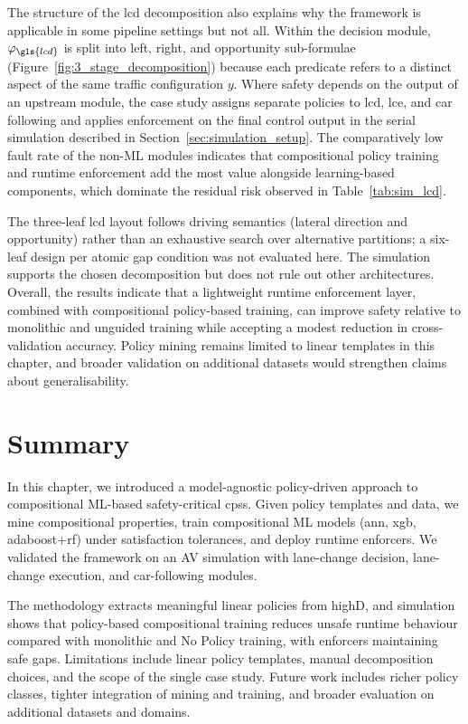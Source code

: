 The structure of the \gls{lcd} decomposition also explains why the framework is applicable in some pipeline settings but not all. Within the decision module, $\varphi_{\gls{lcd}}$ is split into left, right, and opportunity sub-formulae (Figure~\ref{fig:3_stage_decomposition}) because each predicate refers to a distinct aspect of the same traffic configuration $y$. Where safety depends on the output of an upstream module, the case study assigns separate policies to \gls{lcd}, \gls{lce}, and car following and applies enforcement on the final control output in the serial simulation described in Section~\ref{sec:simulation_setup}. The comparatively low fault rate of the non-ML modules indicates that compositional policy training and runtime enforcement add the most value alongside learning-based components, which dominate the residual risk observed in Table~\ref{tab:sim_lcd}.

The three-leaf \gls{lcd} layout follows driving semantics (lateral direction and opportunity) rather than an exhaustive search over alternative partitions; a six-leaf design per atomic gap condition was not evaluated here. The simulation supports the chosen decomposition but does not rule out other architectures. Overall, the results indicate that a lightweight runtime enforcement layer, combined with compositional policy-based training, can improve safety relative to monolithic and unguided training while accepting a modest reduction in cross-validation accuracy. Policy mining remains limited to linear templates in this chapter, and broader validation on additional datasets would strengthen claims about generalisability.


\section{Summary}
\label{sec:av_summary}

In this chapter, we introduced a model-agnostic policy-driven approach to compositional ML-based safety-critical \glspl{cps}. Given policy templates and data, we mine compositional properties, train compositional ML models (\gls{ann}, \gls{xgb}, \gls{adaboost}+\gls{rf}) under satisfaction tolerances, and deploy runtime enforcers. We validated the framework on an AV simulation with lane-change decision, lane-change execution, and car-following modules.

The methodology extracts meaningful linear policies from highD, and simulation shows that policy-based compositional training reduces unsafe runtime behaviour compared with monolithic and No Policy training, with enforcers maintaining safe gaps. Limitations include linear policy templates, manual decomposition choices, and the scope of the single case study. Future work includes richer policy classes, tighter integration of mining and training, and broader evaluation on additional datasets and domains.




